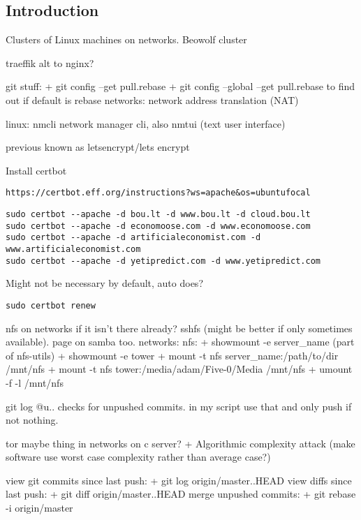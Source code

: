
\subsection{Introduction}

Clusters of Linux machines on networks. Beowolf cluster

traeffik
	alt to nginx?


git stuff:
+ git config --get pull.rebase
+ git config --global --get pull.rebase
to find out if default is rebase
networks: network address translation (NAT)

linux: nmcli network manager cli, also nmtui (text user interface)

previous known as letsencrypt/lets encrypt


Install certbot

\begin{verbatim}
https://certbot.eff.org/instructions?ws=apache&os=ubuntufocal
\end{verbatim}

\begin{verbatim}
sudo certbot --apache -d bou.lt -d www.bou.lt -d cloud.bou.lt
sudo certbot --apache -d economoose.com -d www.economoose.com
sudo certbot --apache -d artificialeconomist.com -d www.artificialeconomist.com
sudo certbot --apache -d yetipredict.com -d www.yetipredict.com
\end{verbatim}

Might not be necessary by default, auto does?
\begin{verbatim}
sudo certbot renew
\end{verbatim}

nfs on networks if it isn't there already? sshfs (might be better if only sometimes available). page on samba too.
networks: nfs:
+ showmount -e server\_name (part of nfs-utils)
+ showmount -e tower
+ mount -t nfs server\_name:/path/to/dir /mnt/nfs
+ mount -t nfs tower:/media/adam/Five-0/Media /mnt/nfs
+ umount -f -l /mnt/nfs


git log @{u}..
checks for unpushed commits. in my script use that and only push if not nothing.

tor
maybe thing in networks on c server?
+ Algorithmic complexity attack (make software use worst case complexity rather than average case?)

view git commits since last push:
+ git log origin/master..HEAD
view diffs since last push:
+ git diff origin/master..HEAD
merge unpushed commits:
+ git rebase -i origin/master


